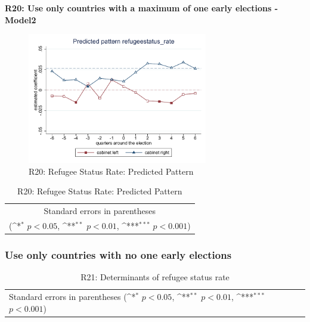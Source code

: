 \documentclass[10pt,a4paper]{scrartcl}
\begin{document}
\clearpage
\textbf{R20: Use only countries with a maximum of one early elections - Model2}
\begin{figure}[!ht]
	\centering
	\includegraphics[width=0.7\textwidth]{figures_edited/refugeestatus_rate_graph2_R20.pdf}
	\caption{R20: Refugee Status Rate: Predicted Pattern}
\end{figure}

\begin{table}[!ht]\centering
	\footnotesize
	\renewcommand{\arraystretch}{1.15}
	\def\sym#1{\ifmmode^{#1}\else\(^{#1}\)\fi}
	\caption{R20: Refugee Status Rate: Predicted Pattern}
	\begin{tabular}{l*{2}{c}}
		\hline\hline
		
		\hline\hline
		\multicolumn{3}{c}{\footnotesize Standard errors in parentheses} \\
		\multicolumn{3}{c}{\footnotesize (\sym{*} \(p<0.05\), \sym{**} \(p<0.01\), \sym{***} \(p<0.001\))} \\
	\end{tabular}
\end{table}




\clearpage
\FloatBarrier
\subsubsection{Use only countries with no one early elections}
\begin{table}[!ht]\centering
	\renewcommand{\arraystretch}{1.25}
	\small
	\def\sym#1{\ifmmode^{#1}\else\(^{#1}\)\fi}
	\caption{R21: Determinants of refugee status rate}
	\begin{tabular}{l*{3}{c}}
		\hline\hline
		
		\hline\hline
		\multicolumn{4}{l}{\footnotesize Standard errors in parentheses (\sym{*} \(p<0.05\), \sym{**} \(p<0.01\), \sym{***} \(p<0.001\))}\\
	\end{tabular}
\end{table}
\end{document}
